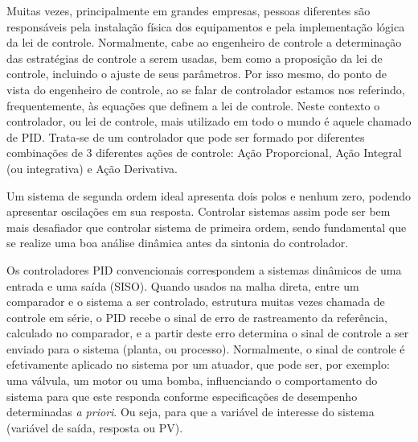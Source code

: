 \documentclass[a4paper,12pt]{article}
\begin{document}
\begin{flushleft}
\begin{flushleft}
\hspace{4ex}Muitas vezes, principalmente em grandes empresas, pessoas diferentes são responsáveis pela instalação física dos equipamentos e pela implementação lógica da lei de controle. Normalmente, cabe ao engenheiro de controle a determinação das estratégias de controle a serem usadas, bem como a proposição da lei de controle, incluindo o ajuste de seus parâmetros. Por isso mesmo, do ponto de vista do engenheiro de controle, ao se falar de controlador estamos nos referindo, frequentemente, às equações que definem a lei de controle. Neste contexto o controlador, ou lei de controle, mais utilizado em todo o mundo é aquele chamado de PID. Trata-se de um controlador que pode ser formado por diferentes combinações de 3 diferentes ações de controle: Ação Proporcional, Ação Integral (ou integrativa) e Ação Derivativa.\newline


\hspace{4ex}Um sistema de segunda ordem ideal apresenta dois polos e nenhum zero, podendo apresentar oscilações em sua resposta. Controlar sistemas assim pode ser bem mais desafiador que controlar sistema de primeira ordem, sendo fundamental que se realize uma boa análise dinâmica antes da sintonia do controlador.

\newpage


\hspace{4ex}Os controladores PID convencionais correspondem a sistemas dinâmicos de uma entrada e uma saída (SISO). Quando usados na malha direta, entre um comparador e o sistema a ser controlado, estrutura muitas vezes chamada de controle em série, o PID recebe o sinal de erro de rastreamento da referência, calculado no comparador, e a partir deste erro determina o sinal de controle a ser enviado para o sistema (planta, ou processo). Normalmente, o sinal de controle é efetivamente aplicado no sistema por um atuador, que pode ser, por exemplo: uma válvula, um motor ou uma bomba, influenciando o comportamento do sistema para que este responda conforme especificações de desempenho determinadas \textit{a priori}. Ou seja, para que a variável de interesse do sistema (variável de saída, resposta ou PV).


\end{flushleft}
\end{flushleft}
\end{document}
